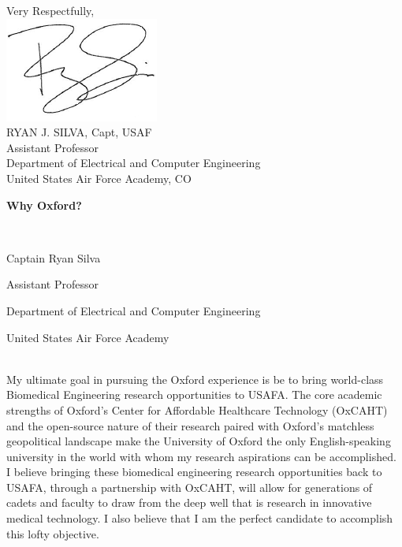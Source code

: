 \documentclass{article}
\begin{document}
\hspace*{2.3in} \noindent Very Respectfully, \\
\hspace*{2.5in} \includegraphics[scale=.5]{silvasig}  \\
\hspace*{2.5in} RYAN J. SILVA, Capt, USAF \\
\hspace*{2.5in} Assistant Professor   \\
\hspace*{2.5in} Department of Electrical and Computer Engineering  \\
\hspace*{2.5in} United States Air Force Academy, CO  \\


\newpage

	\centerline{\LARGE{\textbf{Why Oxford?}}} \hspace{0pt} \\
	\centerline{\Large{Captain Ryan Silva}}
	\centerline{\large{Assistant Professor}}
	\centerline{\large{Department of Electrical and Computer Engineering}}
	\centerline{\large{United States Air Force Academy}} \hspace{0pt} \\
\indent My ultimate goal in pursuing the Oxford experience is be to bring world-class
Biomedical Engineering research opportunities to USAFA. The core academic
strengths of Oxford's Center for Affordable Healthcare Technology (OxCAHT) and
the open-source nature of their research paired with Oxford's matchless
geopolitical landscape make the University of Oxford the only English-speaking
university in the world with whom my research aspirations can be accomplished.
I believe bringing these biomedical engineering research opportunities back
to USAFA, through a partnership with OxCAHT, will allow for generations of cadets
and faculty to draw from the deep well that is research in innovative medical technology.
I also believe that I am the perfect candidate to accomplish
this lofty objective.
\end{document}
